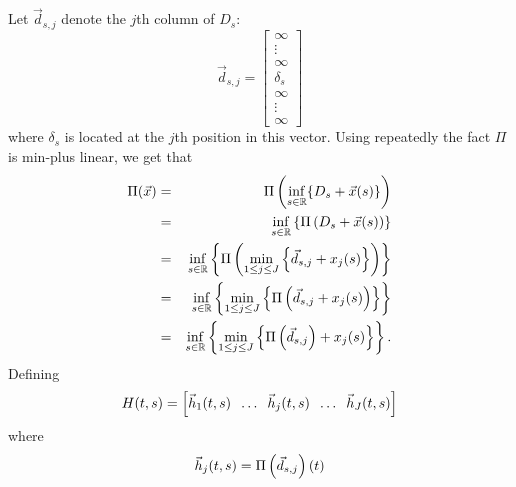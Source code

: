 
%
Let $\vec{d}_{s,j}$ denote the $j$th column of $D_s$:
$$ \vec{d}_{s,j} =  \left[ \begin{array}{c} \infty \\ \vdots \\ \infty \\ \delta_s \\ \infty \\ \vdots \\ \infty \end{array} \right] $$
where $\delta_s$ is located at the $j$th position in this vector.
Using repeatedly the fact $\Pi$ is min-plus linear, we get that
\begin{eqnarray*}
\Pi(\vec{x}) & = & \Pi \left(  \inf_{s \in \mathbb{R}} \{ D_s + \vec{x}(s) \} \right) \\
        & = &  \inf_{s \in \mathbb{R}} \left\{ \Pi \left( D_s + \vec{x}(s) \right) \right\}   \\
        & = &  \inf_{s \in \mathbb{R}} \left\{ \Pi \left( \min_{1 \leq j \leq J} \left\{ \vec{d}_{s,j} + x_j(s) \right\}  \right) \right\} \\
        & = &  \inf_{s \in \mathbb{R}} \left\{ \min_{1 \leq j \leq J} \left\{ \Pi \left( \vec{d}_{s,j} + x_j(s) \right) \right\} \right\} \\
        & = &  \inf_{s \in \mathbb{R}} \left\{ \min_{1 \leq j \leq J} \left\{ \Pi \left( \vec{d}_{s,j}  \right) + x_j(s) \right\} \right\} .
\end{eqnarray*}
Defining
\begin{equation}
\mylabel{eq:impulseresponsecomputed1}
H(t,s) = \left[ \vec{h}_1(t,s) \;\; \ldots \;\; \vec{h}_j(t,s) \;\; \ldots \;\; \vec{h}_J(t,s) \right]
\end{equation}
where
\begin{equation}
\mylabel{eq:impulseresponsecomputed2}
\vec{h}_{j}(t,s) =   \Pi \left( \vec{d}_{s,j}  \right) (t)
\end{equation}
